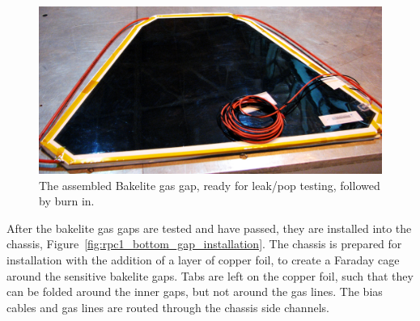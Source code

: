 \begin{figure}
  \centering
  \includegraphics[width=0.7\linewidth]{./figures/rpc1_construction_3}
  \caption{
    The assembled Bakelite gas gap, ready for leak/pop testing, followed by burn
    in.
  }
  \label{fig:rpc1_construction_3}
\end{figure}

After the bakelite gas gaps are tested and have passed, they are installed into
the chassis, Figure~\ref{fig:rpc1_bottom_gap_installation}. The chassis is
prepared for installation with the addition of a layer of copper foil, to create
a Faraday cage around the sensitive bakelite gaps. Tabs are left on the copper
foil, such that they can be folded around the inner gaps, but not around the gas
lines. The bias cables and gas lines are routed through the chassis side
channels.

